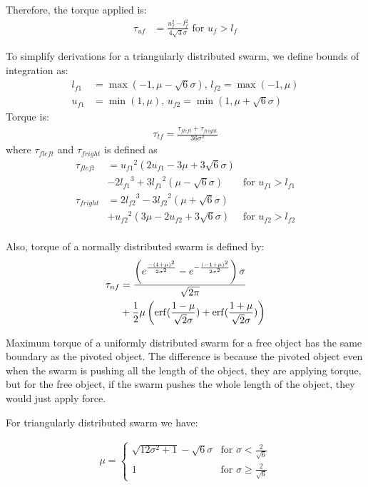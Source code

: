 Therefore, the torque applied is:
\begin{align}
\tau_{uf} &= \frac{u_f^2-l_f^2}{4\sqrt{3}\sigma} \textrm{  for    }  u_f>l_f
\end{align}

To simplify derivations for a triangularly distributed swarm, we define bounds of integration as:
\begin{align}
l_{f1} &= \max({-1,\mu-\sqrt{6}\sigma}), \,l_{f2} = \max({-1,\mu})\\ \nonumber
u_{f1} &= \min({1,\mu}), \, u_{f2} = \min({1,\mu+\sqrt{6}\sigma}) \nonumber
\end{align}
Torque is:
\begin{align}
\tau_{tf} = \frac{\tau_{fleft}+ \tau_{fright}}{36\sigma^2}
\end{align}
where $\tau_{fleft}$ and $\tau_{fright}$ is defined as
\begin{align}\nonumber
\tau_{fleft} &=  {u_{f1}}^2(2u_{f1} - 3\mu+3\sqrt{6}\sigma)\\ \nonumber
&-2{l_{f1}}^3+3{l_{f1}}^2(\mu-\sqrt{6}\sigma) &   \textrm{for     } u_{f1} > l_{f1}\\ \nonumber
\tau_{fright} &= 2{l_{f2}}^3-3{l_{f2}}^2(\mu+\sqrt{6}\sigma)\\ \nonumber
&+{u_{f2}}^2( 3\mu-2u_{f2}+3\sqrt{6}\sigma) &   \textrm{for     } u_{f2} > l_{f2}\\ \nonumber
\end{align}

Also, torque of a normally distributed swarm is defined by:
\begin{align} \nonumber
\tau_{nf} &= \frac{\left(e^{\frac{-(1+\mu)^2}{2\sigma^2}}-e^{-\frac{(-1+\mu)^2}{2\sigma^2}}\right)\sigma}{\sqrt{2\pi}}\\
 &+ \frac{1}{2}\mu\left(\operatorname{erf}(\frac{1-\mu}{\sqrt{2}\sigma})+\operatorname{erf}(\frac{1+\mu}{\sqrt{2}\sigma})\right) 
\end{align}

Maximum torque of a uniformly distributed swarm for a free object has the same boundary as the pivoted object. The difference is because the pivoted object even when the swarm is pushing all the length of the object, they are applying torque, but for the free object, if the swarm pushes the whole length of the object, they would just apply force.

For triangularly distributed swarm we have:

\begin{align}
\mu= \left\{
\begin{array}{ll}
 \sqrt{12\sigma^2 +1}  -\sqrt{6}\sigma &   \textrm{for     }  \sigma  <\frac{2}{\sqrt{6}} \\
1 &   \textrm{for     } \sigma \geq \frac{2}{\sqrt{6}} 
\end{array} 
\right.
\end{align}


